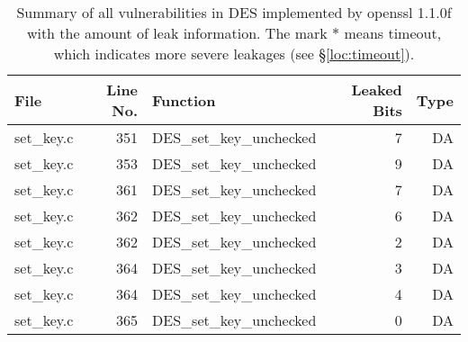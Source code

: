 \begin{table}%
\centering\tiny\scriptsize
\caption{Summary of all vulnerabilities in DES implemented by openssl 1.1.0f with the amount of leak information. The mark $*$ means timeout, which indicates more severe leakages (see \S\ref{loc:timeout}).}\label{tab:DESopenssl}
\begin{tabular}{lrlrr}
\hline
\textbf{File} & \textbf{Line No.} & \textbf{Function} & \textbf{Leaked Bits} & \textbf{Type} \\\hline
set\_key.c& 351&DES\_set\_key\_unchecked&7 &DA\\
set\_key.c& 353&DES\_set\_key\_unchecked&9 &DA\\
set\_key.c& 361&DES\_set\_key\_unchecked&7 &DA\\
set\_key.c& 362&DES\_set\_key\_unchecked&6 &DA\\
set\_key.c& 362&DES\_set\_key\_unchecked&2 &DA\\
set\_key.c& 364&DES\_set\_key\_unchecked&3 &DA\\
set\_key.c& 364&DES\_set\_key\_unchecked&4 &DA\\
set\_key.c& 365&DES\_set\_key\_unchecked&0 &DA\\
\hline
\end{tabular}
\end{table}